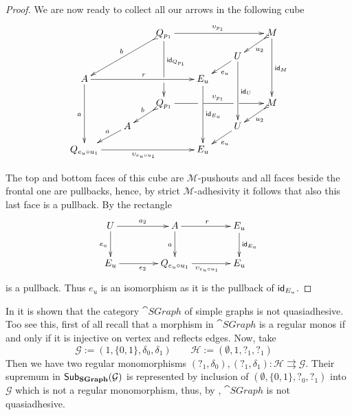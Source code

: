 \begin{proof}
	We are now ready to collect all our arrows in the following cube
	\[\xymatrix@C=20pt@R=10pt{ & &Q_{p_1}\ar@{>->}[ddll]_{b} \ar[ddd]^(.4){\id{Q_{p_1}}}|(.666666)\hole\ar[rrr]^{\upsilon_{p_1}} &&&M \ar[ddd]^{\id{M}} \ar@{>->}[dl]^{u_2}\\&  &&&U \ar[ddd]^{\id{U}} \ar[dl]^{e_u} \\A \ar[ddd]_{a} \ar[rrr]^{r}&&& E_u\ar[ddd]^{\id{E_u}}\\&&Q_{p_1} \ar[rrr]|(.34)\hole^{\upsilon_{p_1}}|(.67)\hole \ar@{>->}[dl]_{b}&&& M \ar@{>->}[dl]^{u_2}\\ & A  \ar[dl]_(.4){a}&&& U \ar[dl]^{e_u} \\ Q_{e_u\circ u_1}\ar[rrr]_{\upsilon_{e_u\circ u_1}} &&& E_u}\]
	
	The top and bottom faces of this cube are $\mathcal{M}$-pushouts and all faces beside the frontal one are pullbacks, hence, by strict $\mathcal{M}$-adhesivity it follows that also this last face is a pullback. By  the rectangle
	\[\xymatrix@C=40pt{U\ar[r]^{a_2} \ar[d]_{e_u} & A \ar[r]^{r} \ar[d]_{a}& E_u \ar[d]^{\id{E_u}}\\
		E_u \ar[r]_{e_2}& Q_{e_u\circ u_1} \ar[r]_{\upsilon_{e_u\circ u_1}} & E_u}\]
	is a pullback. Thus $e_u$ is an isomorphism as it is the pullback of $\mathsf{id}_{E_u}$.
\end{proof}

\begin{example}\label{ex:sem}In \cite{johnstone2007quasitoposes} it is shown that the category $\cat{SGraph}$ of simple graphs is not quasiadhesive. Too see this, first of all recall that a morphism in $\cat{SGraph}$ is a regular monos if and only if it is injective on vertex and reflects edges. Now, take 
	\[\mathcal{G}:=(1, \{0,1\}, \delta_0, \delta_1) \qquad \mathcal{H}:=( \emptyset, 1, ?_1, ?_1) \quad \]
	Then we have two regular monomorphisms $ (?_1, \delta_0), (?_1, \delta_1)\colon \mathcal{H}\rightrightarrows \mathcal{G} $. Their supremum in $\mathsf{Sub}_{\textbf {\textup{SGraph}}}(\mathcal{G})$ is represented by inclusion of $(\emptyset, \{0,1\}, ?_0, ?_1)$ into $\mathcal{G}$ which is not a regular monomorphism, thus, by , $\cat{SGraph}$ is not quasiadhesive. 
\end{example}

